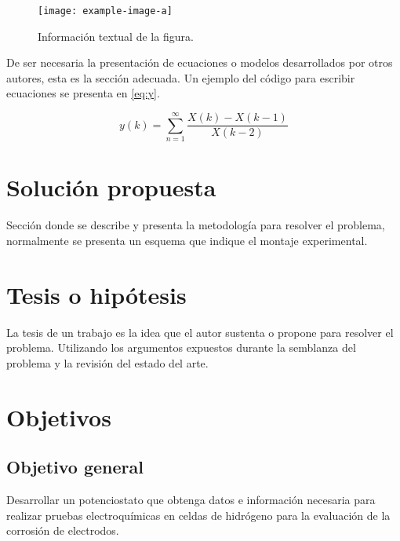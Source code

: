 \documentclass[twocolumns]{IEEEtran}
\begin{document}
\begin{figure}[t!]
\centering
\texttt{[image: example-image-a]}
\caption{Información textual de la figura.}\label{ref:FiguraA}
\end{figure}

De ser necesaria la presentación de ecuaciones o modelos desarrollados por otros autores, esta es la sección adecuada. Un ejemplo del código para escribir ecuaciones se presenta en \eqref{eq:y}.

\begin{equation}
y(k)=\sum_{n=1}^{\infty}\frac{X(k)-X(k-1)}{X(k-2)}\label{eq:y}
\end{equation}

\section{Solución propuesta}
Sección donde se describe y presenta la metodología para resolver el problema, normalmente se presenta un esquema que indique el montaje experimental.

\section{Tesis o hipótesis}
La tesis de un trabajo es la idea que el autor sustenta o propone para resolver el problema. Utilizando los argumentos expuestos  durante la semblanza del problema y la revisión del estado del arte.


\section{Objetivos}
\subsection{Objetivo general}
Desarrollar un potenciostato que obtenga datos e información necesaria para realizar pruebas electroquímicas en celdas de hidrógeno para la evaluación de la corrosión de electrodos.
\end{document}
